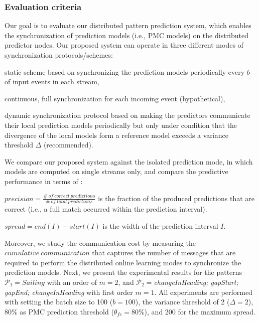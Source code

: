 \subsubsection*{Evaluation criteria} Our goal is to evaluate our distributed pattern prediction system, which enables the synchronization of prediction models (i.e., PMC models) on the distributed predictor nodes. Our proposed system can operate in three different modes of synchronization protocols/schemes: \begin{enumerate*}[label=(\roman*)] 
	\item static scheme based on synchronizing the prediction models periodically every $b$ of input events in each stream, 
\item continuous, full synchronization for each incoming event (hypothetical), 
\item dynamic synchronization protocol based on making the predictors communicate their local prediction models periodically but only under condition that the divergence of the local models form a reference model exceeds a variance threshold $\Delta$ (recommended).  	   

\end{enumerate*}
We compare our proposed system against the isolated prediction mode, in which models are computed on single streams only, and compare the predictive performance in terms of :
\begin{enumerate*}[label=(\roman*)]
	
\item  $\mathit{precision = \frac{\#\ of\ correct\ predictions}{\#\ of\ total\ predictions}}$ is the fraction of the produced predictions that are correct (i.e., a full match occurred within the prediction interval).   

\item $\mathit{spread} =end(I) -start(I)$ is the width of the prediction interval $I$. 

\end{enumerate*} 
\par Moreover, we study the communication cost by measuring the $\mathit{cumulative\ communication}$ that captures the number of messages that are required to perform the distributed online learning modes to synchronize the prediction models. Next, we present the experimental results for the patterns  $\mathcal{P}_1=Sailing$ with an order of $m=2$, and   $\mathcal{P}_2=$\textit{changeInHeading; gapStart; gapEnd; changeInHeading} with first order $m=1$. All experiments are performed with setting the batch size to 100  ($b=100$), the variance threshold of 2 ($\Delta=2$), $80\%$ as PMC prediction threshold ($\theta_{fc}=80\%$), and 200 for the maximum spread.


